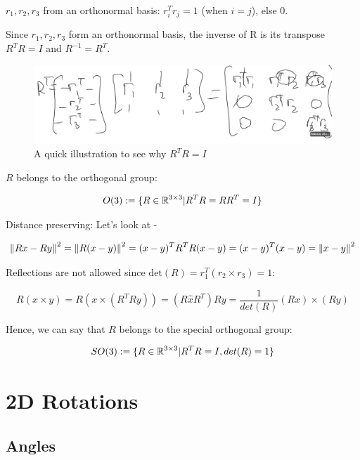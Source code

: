 $r_1, r_2, r_3$ from an orthonormal basis: $r_i^Tr_j = 1$ (when $i=j$), else $0$.

Since $r_1, r_2, r_3$ form an orthonormal basis, the inverse of R is its transpose $R^TR=I$ and $R^{-1} = R^T$.

\begin{figure}[h]\centering\includegraphics[width=12cm]{img/j_3_3.png}\caption{A quick illustration to see why $R^TR=I$}\end{figure}

$R$ belongs to the orthogonal group:

\begin{equation*}
    O(3): = \{ R\in \mathbb{R}^{3\times 3} | R^TR = RR^T = I\}
\end{equation*}

Distance preserving: Let's look at -

\begin{equation*}
    \begin{split}
        \left\lVert Rx - Ry\right\rVert^2 = \left\lVert R(x - y)\right\rVert^2 = (x - y)^TR^TR(x - y) = (x - y)^T(x - y) = \left\lVert x - y\right\rVert^2
    \end{split}
\end{equation*}


Reflections are not allowed since $\text{det}(R) = r_1^T(r_2\times r_3) = 1$:

\begin{equation*}
    R(x\times y) = R(x\times (R^TRy)) = (R\hat{x}R^T)Ry = \frac{1}{det(R)}(Rx)\times (Ry)
\end{equation*}

Hence, we can say that $R$ belongs to the special orthogonal group:

\begin{equation*}
    SO(3) : = \{ R\in \mathbb{R}^{3\times 3} | R^TR = I, det(R) = 1\}
\end{equation*}

\section{2D Rotations}

\subsection{Angles}

